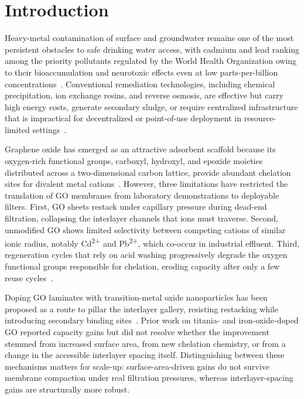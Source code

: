 \section{Introduction}

Heavy-metal contamination of surface and groundwater remains one of the most persistent obstacles to safe drinking water access, with cadmium and lead ranking among the priority pollutants regulated by the World Health Organization owing to their bioaccumulation and neurotoxic effects even at low parts-per-billion concentrations~\cite{Feldt2022}. Conventional remediation technologies, including chemical precipitation, ion exchange resins, and reverse osmosis, are effective but carry high energy costs, generate secondary sludge, or require centralized infrastructure that is impractical for decentralized or point-of-use deployment in resource-limited settings~\cite{Anand2023}.

Graphene oxide has emerged as an attractive adsorbent scaffold because its oxygen-rich functional groups, carboxyl, hydroxyl, and epoxide moieties distributed across a two-dimensional carbon lattice, provide abundant chelation sites for divalent metal cations~\cite{Voss2021}. However, three limitations have restricted the translation of GO membranes from laboratory demonstrations to deployable filters. First, GO sheets restack under capillary pressure during dead-end filtration, collapsing the interlayer channels that ions must traverse. Second, unmodified GO shows limited selectivity between competing cations of similar ionic radius, notably Cd\textsuperscript{2+} and Pb\textsuperscript{2+}, which co-occur in industrial effluent. Third, regeneration cycles that rely on acid washing progressively degrade the oxygen functional groups responsible for chelation, eroding capacity after only a few reuse cycles~\cite{Osei2024}.

Doping GO laminates with transition-metal oxide nanoparticles has been proposed as a route to pillar the interlayer gallery, resisting restacking while introducing secondary binding sites~\cite{Calder2020}. Prior work on titania- and iron-oxide-doped GO reported capacity gains but did not resolve whether the improvement stemmed from increased surface area, from new chelation chemistry, or from a change in the accessible interlayer spacing itself. Distinguishing between these mechanisms matters for scale-up: surface-area-driven gains do not survive membrane compaction under real filtration pressures, whereas interlayer-spacing gains are structurally more robust.

